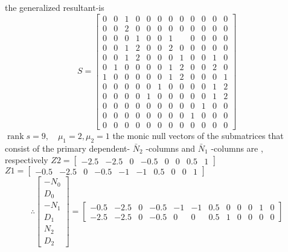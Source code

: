 \documentclass{article}
\begin{document}
the generalized resultant-is
\[
S=\left[\begin{array}{llllllllllll}
0 & 0 & 1 & 0 & 0 & 0 & 0 & 0 & 0 & 0 & 0 & 0 \\
0 & 0 & 2 & 0 & 0 & 0 & 0 & 0 & 0 & 0 & 0 & 0 \\
0 & 0 & 0 & 1 & 0 & 0 & 1 & & 0 & 0 & 0 & 0 \\
0 & 0 & 1 & 2 & 0 & 0 & 2 & 0 & 0 & 0 & 0 & 0 \\
0 & 0 & 1 & 2 & 0 & 0 & 0 & 1 & 0 & 0 & 1 & 0 \\
0 & 1 & 0 & 0 & 0 & 0 & 1 & 2 & 0 & 0 & 2 & 0 \\
1 & 0 & 0 & 0 & 0 & 0 & 1 & 2 & 0 & 0 & 0 & 1 \\
0 & 0 & 0 & 0 & 0 & 1 & 0 & 0 & 0 & 0 & 1 & 2 \\
0 & 0 & 0 & 0 & 1 & 0 & 0 & 0 & 0 & 0 & 1 & 2 \\
0 & 0 & 0 & 0 & 0 & 0 & 0 & 0 & 0 & 1 & 0 & 0 \\
0 & 0 & 0 & 0 & 0 & 0 & 0 & 0 & 1 & 0 & 0 & 0 \\
0 & 0 & 0 & 0 & 0 & 0 & 0 & 0 & 0 & 0 & 0 & 0
\end{array}\right]
\]
$\operatorname{rank} s=9, \quad \mu_{1}=2, \mu_{2}=1$
the monic null vectors of the submatrices that consist of the primary dependent- $\bar{N}_{2}$ -columns and
$\bar{N}_{1}$ -columns are , respectively
$Z 2=\left[\begin{array}{llllllll}-2.5 & -2.5 & 0 & -0.5 & 0 & 0 & 0.5 & 1\end{array}\right]$
$Z 1=\left[\begin{array}{llllllllll}-0.5 & -2.5 & 0 & -0.5 & -1 & -1 & 0.5 & 0 & 0 & 1\end{array}\right]$
\[
\therefore\left[\begin{array}{c}
-N_{0} \\
D_{0} \\
-N_{1} \\
D_{1} \\
N_{2} \\
D_{2}
\end{array}\right]=\left[\begin{array}{cccccccccccc}
-0.5 & -2.5 & 0 & -0.5 & -1 & -1 & 0.5 & 0 & 0 & 0 & 1 & 0 \\
-2.5 & -2.5 & 0 & -0.5 & 0 & 0 & 0.5 & 1 & 0 & 0 & 0 & 0
\end{array}\right]
\]
\end{document}
